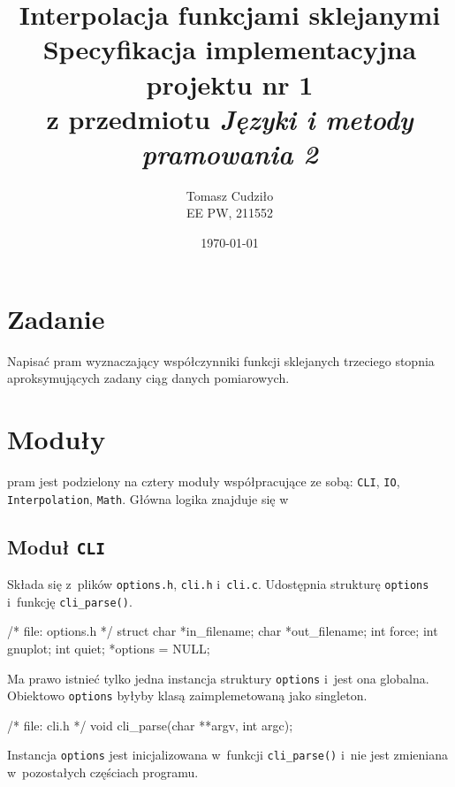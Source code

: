 \documentclass[12pt,a4paper]{article}
\newcommand{\p}[1]{\texttt{#1}}
\begin{document}
\title{ 
  Interpolacja funkcjami sklejanymi\\
  {\normalsize Specyfikacja implementacyjna projektu nr 1}\\\vspace{-12pt}
  {\normalsize z przedmiotu \emph{Języki i metody pramowania 2}}
}
\author{
  Tomasz Cudziło\\
  {\small EE PW, 211552}
}
\date{\today}
\maketitle

\section*{Zadanie}
\label{sec:zadanie}

Napisać pram wyznaczający współczynniki funkcji sklejanych trzeciego stopnia
aproksymujących zadany ciąg danych pomiarowych.

\vspace{24pt}

\section{Moduły}
pram jest podzielony na cztery moduły współpracujące ze sobą: \p{CLI},
\p{IO}, \p{Interpolation}, \p{Math}. Główna logika znajduje się w~

\subsection{Moduł \p{CLI}}
Składa się z~plików \p{options.h}, \p{cli.h} i~\p{cli.c}. Udostępnia strukturę
\p{options} i~funkcję \p{cli\_parse()}.
\begin{SmallVerbatim}
    /* file: options.h */
    struct {
      char *in_filename;
      char *out_filename;
      int force;
      int gnuplot;
      int quiet;
    } *options = NULL;
\end{SmallVerbatim}
Ma prawo istnieć tylko jedna instancja struktury \p{options} i~jest ona
globalna. Obiektowo \p{options} byłyby klasą zaimplemetowaną jako singleton.
\begin{SmallVerbatim}
    /* file: cli.h */
    void cli_parse(char **argv, int argc);
\end{SmallVerbatim}
Instancja \p{options} jest inicjalizowana w~funkcji \p{cli\_parse()} i~nie jest
zmieniana w~pozostałych częściach programu.
\end{document}
